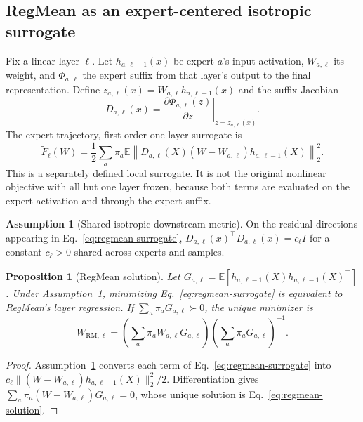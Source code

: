 \documentclass[letterpaper]{article} %
\theoremstyle{plain}
\newtheorem{proposition}[theorem]{Proposition}
\theoremstyle{definition}
\newtheorem{assumption}[theorem]{Assumption}
\begin{document}
\subsection{RegMean as an expert-centered isotropic surrogate}
\label{app:regmean-proof}

Fix a linear layer $\ell$.
Let $h_{a,\ell-1}(x)$ be expert $a$'s input activation, $W_{a,\ell}$ its weight, and $\Phi_{a,\ell}$ the expert suffix from that layer's output to the final representation.
Define $z_{a,\ell}(x)=W_{a,\ell}h_{a,\ell-1}(x)$ and the suffix Jacobian \[ D_{a,\ell}(x)= \left.\frac{\partial\Phi_{a,\ell}(z)}{\partial z} \right|_{z=z_{a,\ell}(x)}.
\] The expert-trajectory, first-order one-layer surrogate is
\begin{equation}
\widetilde F_\ell(W)=
\frac12\sum_a\pi_a\mathbb E
\left\|
D_{a,\ell}(X)(W-W_{a,\ell})h_{a,\ell-1}(X)
\right\|_2^2.
\label{eq:regmean-surrogate}
\end{equation}
This is a separately defined local surrogate.
It is not the original nonlinear objective with all but one layer frozen, because both terms are evaluated on the expert activation and through the expert suffix.

\begin{assumption}[Shared isotropic downstream metric]
\label{ass:isotropic}
On the residual directions appearing in Eq.~\eqref{eq:regmean-surrogate}, $D_{a,\ell}(x)^\top D_{a,\ell}(x)=c_\ell I$ for a constant $c_\ell>0$ shared across experts and samples.
\end{assumption}

\begin{proposition}[RegMean solution]
\label{prop:regmean-formal}
Let $G_{a,\ell}=\mathbb E[h_{a,\ell-1}(X)h_{a,\ell-1}(X)^\top]$.
Under Assumption~\ref{ass:isotropic}, minimizing Eq.~\eqref{eq:regmean-surrogate} is equivalent to RegMean's layer regression.
If $\sum_a\pi_aG_{a,\ell}\succ0$, the unique minimizer is
\begin{equation}
W_{\mathrm{RM},\ell}
=\left(\sum_a\pi_aW_{a,\ell}G_{a,\ell}\right)
 \left(\sum_a\pi_aG_{a,\ell}\right)^{-1}.
\label{eq:regmean-solution}
\end{equation}
\end{proposition}

\begin{proof}
Assumption~\ref{ass:isotropic} converts each term of Eq.~\eqref{eq:regmean-surrogate} into $c_\ell\|(W-W_{a,\ell})h_{a,\ell-1}(X)\|_2^2/2$.
Differentiation gives $\sum_a\pi_a(W-W_{a,\ell})G_{a,\ell}=0$, whose unique solution is Eq.~\eqref{eq:regmean-solution}.
\end{proof}
\end{document}
